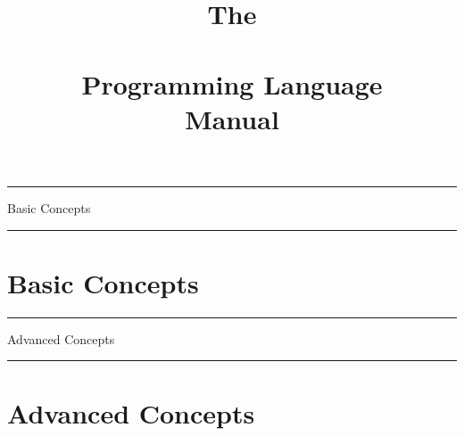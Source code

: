 \documentclass[10pt]{article}
\begin{document}
\title{The\\ \charmpp\\ Programming Language\\ Manual}
\credits{\hspace{0 in}}
\maketitle



\begin{titlepage}%
 \rule{\textwidth}{3pt}
 \vspace{\fill}
 \begin{flushright}
   \textsf{\Huge Basic Concepts \\}
 \end{flushright}
 \vspace{\fill}
 \rule{\textwidth}{3pt}
\end{titlepage}



\section{Basic Concepts}

  	
  	
  
  
  
  
  
  
  
  
  
\begin{titlepage}%
 \rule{\textwidth}{3pt}
 \vspace{\fill}
 \begin{flushright}
   \textsf{\Huge Advanced Concepts \\}
 \end{flushright}
 \vspace{\fill}
 \rule{\textwidth}{3pt}
\end{titlepage}

\section{Advanced Concepts}

  
  
  
  
  
  
  
  
  
  
      
      
  
  
  



%






\appendix


%






\end{document}

